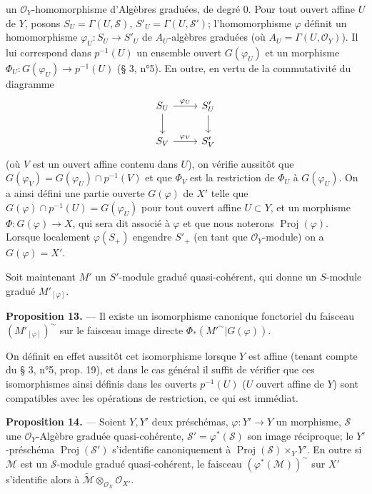 un $\mathcal{O}_Y$-homomorphisme d'Algèbres graduées, de degré $0$. Pour tout ouvert affine $U$ de $Y$, posons $S_U = \Gamma(U, \mathcal{S})$, $S'_U = \Gamma(U, \mathcal{S}')$; l'homomorphisme $\varphi$ définit un homomorphisme $\varphi_U : S_U \to S'_U$ de $A_U$-algèbres graduées (où $A_U = \Gamma(U, \mathcal{O}_Y)$). Il lui correspond dans $p^{-1}(U)$ un ensemble ouvert $G(\varphi_U)$ et un morphisme $\Phi_U : G(\varphi_U) \to p^{-1}(U)$ (§ 3, n°5). En outre, en vertu de la commutativité du diagramme
$$\begin{tikzcd}
S_U \arrow[r, "\varphi_U"] \arrow[d] & S'_U \arrow[d] \\
S_V \arrow[r, "\varphi_V"] & S'_V
\end{tikzcd}$$
(où $V$ est un ouvert affine contenu dans $U$), on vérifie aussitôt que $G(\varphi_V) = G(\varphi_U) \cap p^{-1}(V)$ et que $\Phi_V$ est la restriction de $\Phi_U$ à $G(\varphi_U)$. On a ainsi défini une partie ouverte $G(\varphi)$ de $X'$ telle que $G(\varphi) \cap p^{-1}(U) = G(\varphi_U)$ pour tout ouvert affine $U \subset Y$, et un morphisme $\Phi : G(\varphi) \to X$, qui sera dit associé à $\varphi$ et que nous noterons $\operatorname{Proj}(\varphi)$. Lorsque localement $\varphi(S_+)$ engendre $S'_+$ (en tant que $\mathcal{O}_Y$-module) on a $G(\varphi)=X'$.

Soit maintenant $M'$ un $S'$-module gradué quasi-cohérent, qui donne un $S$-module gradué $M'_{[\varphi]}$.

\textbf{Proposition 13.} — Il existe un isomorphisme canonique fonctoriel du faisceau $(M'_{[\varphi]})^{\sim}$ sur le faisceau image directe $\Phi_*(M'^{\sim} | G(\varphi))$.

On définit en effet aussitôt cet isomorphisme lorsque $Y$ est affine (tenant compte du § 3, n°5, prop. 19), et dans le cas général il suffit de vérifier que ces isomorphismes ainsi définis dans les ouverts $p^{-1}(U)$ ($U$ ouvert affine de $Y$) sont compatibles avec les opérations de restriction, ce qui est immédiat.

\textbf{Proposition 14.} — Soient $Y, Y'$ deux préschémas, $\varphi : Y' \to Y$ un morphisme, $\mathcal{S}$ une $\mathcal{O}_Y$-Algèbre graduée quasi-cohérente, $\mathcal{S}' = \varphi^*(\mathcal{S})$ son image réciproque; le $Y'$-préschéma $\operatorname{Proj}(\mathcal{S}')$ s'identifie canoniquement à $\operatorname{Proj}(\mathcal{S}) \times_Y Y'$. En outre si $\mathcal{M}$ est un $\mathcal{S}$-module gradué quasi-cohérent, le faisceau $(\varphi^*(\mathcal{M}))^{\sim}$ sur $X'$ s'identifie alors à $\tilde{\mathcal{M}} \otimes_{\mathcal{O}_X} \mathcal{O}_{X'}$.

